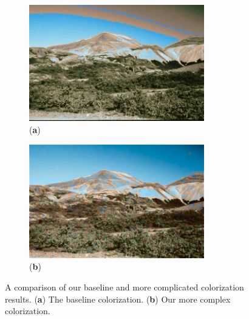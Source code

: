 \begin{figure}[H]
    \centering
    \begin{subfigure}{3.1in}
        \centering
        \includegraphics[width=3in]{./Images/mountain_gray_colored_40.png}
        \caption{(\textbf{a})}
    \end{subfigure}
    \begin{subfigure}{3.1in}
        \centering
        \includegraphics[width=3in]{./Images/landscape_5.png}
        \caption{(\textbf{b})}
    \end{subfigure}
    \caption{A comparison of our baseline and more complicated colorization results. (\textbf{a}) The baseline colorization. (\textbf{b}) Our more complex colorization.}
    \label{fig:algo_compare}
\end{figure}